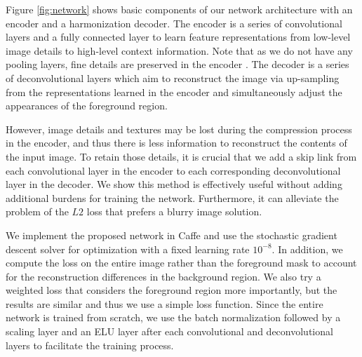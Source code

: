 \documentclass[10pt,twocolumn,letterpaper]{article}
\begin{document}
{}
%
Figure \ref{fig:network} shows basic components of our network architecture
with an encoder and a harmonization decoder.
%
The encoder is a series of convolutional layers and a fully connected layer to learn feature representations from low-level image details to high-level context information.
%
Note that as we do not have any pooling layers, 
fine details are preserved in the encoder \cite{Pathak_CVPR_2016}.
%
The decoder is a series of deconvolutional layers 
which aim to reconstruct the image via up-sampling from the representations learned in the encoder and simultaneously adjust the appearances of the foreground region.

However, image details and textures may be lost during the compression process in the encoder, and thus there is less information to reconstruct the contents of the input image.
%
To retain those details, it is crucial that 
we add a skip link from each convolutional layer in the encoder to each corresponding deconvolutional layer in the decoder.
%
We show this method is effectively useful without adding additional burdens for training the network.
%
Furthermore, it can alleviate the problem of the $L2$ loss that prefers a blurry image solution. 
%

{}
%
We implement the proposed network in Caffe \cite{jia2014caffe} and use the stochastic gradient descent solver for optimization with a fixed learning rate $10^{-8}$.
%
In addition, we compute the loss on the entire image rather than the foreground mask to account for the reconstruction differences in the background region.
%
We also try a weighted loss that considers the foreground region more importantly, but
 the results are similar and thus we use a simple loss function. 
%
Since the entire network is trained from scratch, we use the batch normalization \cite{Ioffe_ICML_2015} followed by a scaling layer and an ELU layer \cite{Clevert_ICLR_2016} after each convolutional and deconvolutional layers to facilitate the training process.
%
\end{document}
